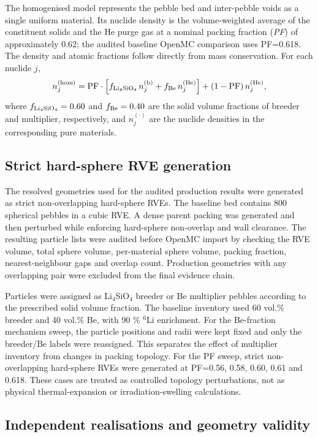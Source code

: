 \documentclass[preprint,12pt]{elsarticle}
\begin{document}
The homogenised model represents the pebble bed and inter-pebble voids as a
single uniform material.  Its nuclide density is the volume-weighted average of
the constituent solids and the He purge gas at a nominal packing fraction
(\textit{PF}) of approximately 0.62; the audited baseline OpenMC comparison uses
PF=0.618.  The density and atomic fractions follow directly from
mass conservation.  For each nuclide $j$,
%
\begin{equation}
n_j^{\rm (hom)} = {\rm PF}\cdot\Bigl[f_{\rm Li_4SiO_4}\,n_j^{\rm (b)}
+ f_{\rm Be}\,n_j^{\rm (Be)}\Bigr]
+ (1-{\rm PF})\,n_j^{\rm (He)},
\label{eq:hom}
\end{equation}
%
where $f_{\rm Li_4SiO_4}=0.60$ and $f_{\rm Be}=0.40$ are the solid volume
fractions of breeder and multiplier, respectively, and $n_j^{(\cdot)}$ are the
nuclide densities in the corresponding pure materials.


\subsection{Strict hard-sphere RVE generation}

The resolved geometries used for the audited production results were generated
as strict non-overlapping hard-sphere RVEs.  The baseline bed contains 800
spherical pebbles in a cubic RVE.  A dense parent packing was generated and then
perturbed while enforcing hard-sphere non-overlap and wall clearance.  The
resulting particle lists were audited before OpenMC import by checking the RVE
volume, total sphere volume, per-material sphere volume, packing fraction,
nearest-neighbour gaps and overlap count.  Production geometries with any
overlapping pair were excluded from the final evidence chain.

Particles were assigned as Li$_4$SiO$_4$ breeder or Be multiplier pebbles
according to the prescribed solid volume fraction.  The baseline inventory used
60 vol.\% breeder and 40 vol.\% Be, with 90 \% $^6$Li enrichment.  For the
Be-fraction mechanism sweep, the particle positions and radii were kept fixed
and only the breeder/Be labels were reassigned.  This separates the effect of
multiplier inventory from changes in packing topology.  For the PF sweep,
strict non-overlapping hard-sphere RVEs were generated at PF=0.56, 0.58, 0.60,
0.61 and 0.618.  These cases are treated as controlled topology perturbations,
not as physical thermal-expansion or irradiation-swelling calculations.

\subsection{Independent realisations and geometry validity}
\end{document}
